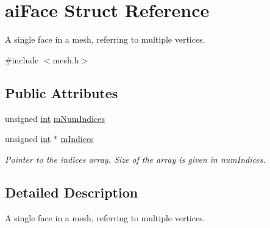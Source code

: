 \hypertarget{structai_face}{\section{ai\-Face Struct Reference}
\label{structai_face}
}


A single face in a mesh, referring to multiple vertices.  




{\ttfamily \#include $<$mesh.\-h$>$}

\subsection*{Public Attributes}
\begin{DoxyCompactItemize}
\item 
unsigned \hyperlink{_s_d_l__thread_8h_a6a64f9be4433e4de6e2f2f548cf3c08e}{int} \hyperlink{structai_face_adda2698cec0ebfe651572f4a5701360b}{m\-Num\-Indices}
\item 
unsigned \hyperlink{_s_d_l__thread_8h_a6a64f9be4433e4de6e2f2f548cf3c08e}{int} $\ast$ \hyperlink{structai_face_a2026b434c40cf1636f9f464a592ec36c}{m\-Indices}
\begin{DoxyCompactList}\small\item\em Pointer to the indices array. Size of the array is given in num\-Indices. \end{DoxyCompactList}\end{DoxyCompactItemize}


\subsection{Detailed Description}
A single face in a mesh, referring to multiple vertices. 

